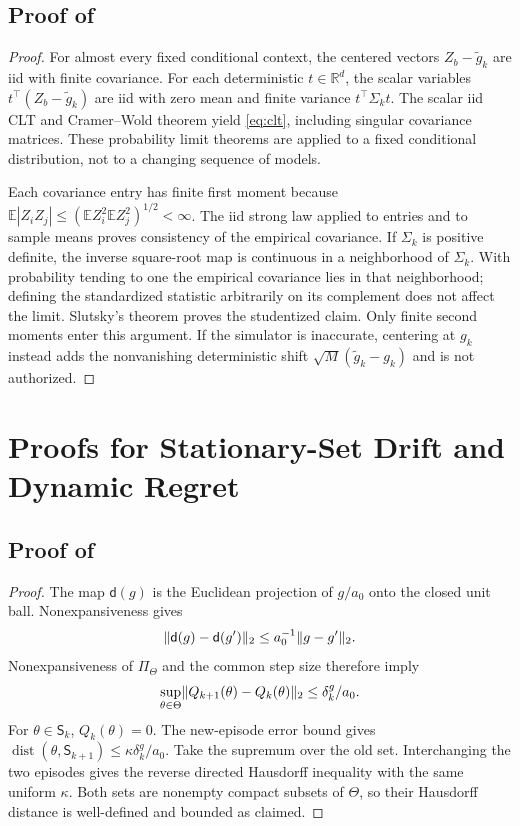\documentclass[11pt]{article}
\newcommand{\E}{\mathbb E}
\newcommand{\R}{\mathbb R}
\newcommand{\1}{\mathbf 1}
\newcommand{\dist}{\operatorname{dist}}
\DeclarePairedDelimiter{\norm}{\lVert}{\rVert}
\newcommand{\Sta}{\mathsf S}
\begin{document}
\subsection{Proof of \texorpdfstring{}{the fixed-episode CLT}}
\begin{proof}
For almost every fixed conditional context, the centered vectors $Z_b-\widetilde g_k$ are iid with finite covariance. For each deterministic $t\in\R^d$, the scalar variables $t^\top(Z_b-\widetilde g_k)$ are iid with zero mean and finite variance $t^\top\Sigma_kt$. The scalar iid CLT and Cramer--Wold theorem yield \eqref{eq:clt}, including singular covariance matrices. These probability limit theorems are applied to a fixed conditional distribution, not to a changing sequence of models.

Each covariance entry has finite first moment because
$\E|Z_iZ_j|\le(\E Z_i^2\E Z_j^2)^{1/2}<\infty$. The iid strong law applied to entries and to sample means proves consistency of the empirical covariance. If $\Sigma_k$ is positive definite, the inverse square-root map is continuous in a neighborhood of $\Sigma_k$. With probability tending to one the empirical covariance lies in that neighborhood; defining the standardized statistic arbitrarily on its complement does not affect the limit. Slutsky's theorem proves the studentized claim. Only finite second moments enter this argument. If the simulator is inaccurate, centering at $g_k$ instead adds the nonvanishing deterministic shift $\sqrt M(\widetilde g_k-g_k)$ and is not authorized.
\end{proof}

\section{Proofs for Stationary-Set Drift and Dynamic Regret}\label{app:regret-proofs}
\subsection{Proof of \texorpdfstring{}{the stationary-set drift lemma}}
\begin{proof}
The map $\mathsf d(g)$ is the Euclidean projection of $g/a_0$ onto the closed unit ball. Nonexpansiveness gives
\begin{equation}\label{eq:normalization-lipschitz}
 \norm{\mathsf d(g)-\mathsf d(g')}_2\le a_0^{-1}\norm{g-g'}_2.
\end{equation}
Nonexpansiveness of $\Pi_\Theta$ and the common step size therefore imply
\[
 \sup_{\theta\in\Theta}\norm{Q_{k+1}(\theta)-Q_k(\theta)}_2
 \le \delta_k^{g}/a_0.
\]
For $\theta\in\Sta_k$, $Q_k(\theta)=0$. The new-episode error bound gives
$\dist(\theta,\Sta_{k+1})\le\kappa \delta_k^{g}/a_0$.
Take the supremum over the old set. Interchanging the two episodes gives the reverse directed Hausdorff inequality with the same uniform $\kappa$. Both sets are nonempty compact subsets of $\Theta$, so their Hausdorff distance is well-defined and bounded as claimed.
\end{proof}
\end{document}
